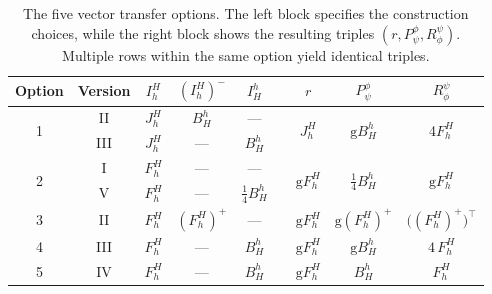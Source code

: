 \documentclass[11pt,reqno]{amsart}
\theoremstyle{plain}
\begin{document}
		\begin{table}[h]
			\centering
			\label{tab:options}
			\renewcommand{\arraystretch}{1.4}
			\begin{tabular}{cc ccc ||c c c c}
				\hline
				{Option} & {Version} & $I^H_h$ & $(I^H_h)^-$ & $I^h_H$
				& & $r$ & $P_\psi^\phi$ & $R_\phi^\psi$  \\
				\hline
				\multirow{2}{*}{1}
				& II  & $J^H_h$ & $B^h_H$     & --- &      & \multirow{2}{*}{$J^H_h$}
				& \multirow{2}{*}{$\mathrm{g}B^h_H$}
				& \multirow{2}{*}{4$F^H_h$}\\
				& III & $J^H_h$ & ---         & $B^h_H$ &   & & & \\
				\hline
				\multirow{2}{*}{2}
				& I & $F^H_h$ & ---         & ---  &     & \multirow{2}{*}{$\mathrm{g}F^H_h$}
				& \multirow{2}{*}{$\frac{1}{4}B^h_H$} 
				& \multirow{2}{*}{$\mathrm{g}F^H_h$} \\
				& V & $F^H_h$ & ---          & $\frac{1}{4}B^h_H$ &    & & & \\
				
				\hline
				3   & II  & $F^H_h$ & $(F^H_h)^+$ & ---  &     & $\mathrm{g}F^H_h$ & $\mathrm{g}(F^H_h)^+$ & $\big((F^H_h)^+\big)^\top$ \\
				\hline
				4   & III   & $F^H_h$     & ---     & $B^h_H$ &   & $\mathrm{g}F^H_h$ & $\mathrm{g}B^h_H$ & $4\,F^H_h$  \\
				\hline
				5   & IV   & $F^H_h$     & ---     & $B^h_H$ &   & $\mathrm{g}F^H_h$ & $B^h_H$ & $F^H_h$  \\
			\end{tabular}
			\caption{The five vector transfer options. The left block specifies the construction choices, while the right block shows the resulting triples $(r,P_\psi^\phi,R_\phi^\psi)$.
				Multiple rows within the same option yield identical triples.}
			\label{tab:CC_vectort_ransports}
		\end{table} 
		
		
		
\end{document}
